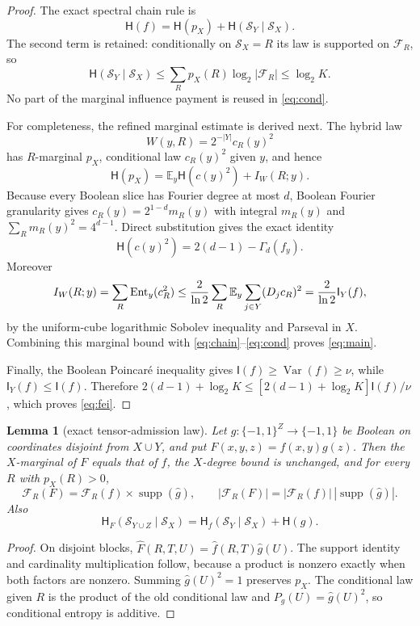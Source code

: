 \documentclass[11pt]{article}
\newtheorem{lemma}{Lemma}
\newcommand{\bits}{\{-1,1\}}
\newcommand{\HH}{\mathsf H}
\newcommand{\II}{\mathsf I}
\newcommand{\E}{\mathbb E}
\newcommand{\wh}[1]{\widehat{#1}}
\begin{document}
\begin{proof}
The exact spectral chain rule is
\begin{equation}\label{eq:chain}
 \HH(f)=\HH(p_X)+\HH(\mathcal S_Y\mid\mathcal S_X).
\end{equation}
The second term is retained: conditionally on $\mathcal S_X=R$ its law is supported
on $\mathcal F_R$, so
\begin{equation}\label{eq:cond}
 \HH(\mathcal S_Y\mid\mathcal S_X)
 \le\sum_Rp_X(R)\log_2|\mathcal F_R|\le\log_2K.
\end{equation}
No part of the marginal influence payment is reused in \eqref{eq:cond}.

For completeness, the refined marginal estimate is derived next.  The hybrid law
\[
 W(y,R)=2^{-|Y|}c_R(y)^2
\]
has $R$-marginal $p_X$, conditional law $c_R(y)^2$ given $y$, and hence
\[
 \HH(p_X)=\E_y\HH(c(y)^2)+I_W(R;y).
\]
Because every Boolean slice has Fourier degree at most $d$, Boolean Fourier
granularity gives $c_R(y)=2^{1-d}m_R(y)$ with integral $m_R(y)$ and
$\sum_Rm_R(y)^2=4^{d-1}$.  Direct substitution gives the exact identity
\[
 \HH(c(y)^2)=2(d-1)-\Gamma_d(f_y).
\]
Moreover
\[
 I_W(R;y)=\sum_R\operatorname{Ent}_y(c_R^2)
 \le {2\over\ln2}\sum_R\E_y\sum_{j\in Y}(D_jc_R)^2
 ={2\over\ln2}\II_Y(f),
\]
by the uniform-cube logarithmic Sobolev inequality and Parseval in $X$.
Combining this marginal bound with \eqref{eq:chain}--\eqref{eq:cond} proves
\eqref{eq:main}.

Finally, the Boolean Poincar\'e inequality gives
$\II(f)\ge\operatorname{Var}(f)\ge\nu$, while $\II_Y(f)\le\II(f)$.
Therefore $2(d-1)+\log_2K\le[2(d-1)+\log_2K]\II(f)/\nu$,
which proves \eqref{eq:fei}.
\end{proof}

\begin{lemma}[exact tensor-admission law]\label{lem:tensor}
Let $g:\bits^Z\to\bits$ be Boolean on coordinates disjoint from $X\cup Y$, and put
$F(x,y,z)=f(x,y)g(z)$.  Then the $X$-marginal of $F$ equals that of $f$, the
$X$-degree bound is unchanged, and for every $R$ with $p_X(R)>0$,
\[
 \mathcal F_R(F)=\mathcal F_R(f)\times\operatorname{supp}(\wh g),\qquad
 |\mathcal F_R(F)|=|\mathcal F_R(f)|\,|\operatorname{supp}(\wh g)|.
\]
Also
\[
 \HH_F(\mathcal S_{Y\cup Z}\mid\mathcal S_X)
 =\HH_f(\mathcal S_Y\mid\mathcal S_X)+\HH(g).
\]
\end{lemma}

\begin{proof}
On disjoint blocks, $\wh F(R,T,U)=\wh f(R,T)\wh g(U)$.  The support identity and
cardinality multiplication follow, because a product is nonzero exactly when both
factors are nonzero.  Summing $\wh g(U)^2=1$ preserves $p_X$.  The conditional law
given $R$ is the product of the old conditional law and $P_g(U)=\wh g(U)^2$, so
conditional entropy is additive.
\end{proof}
\end{document}

